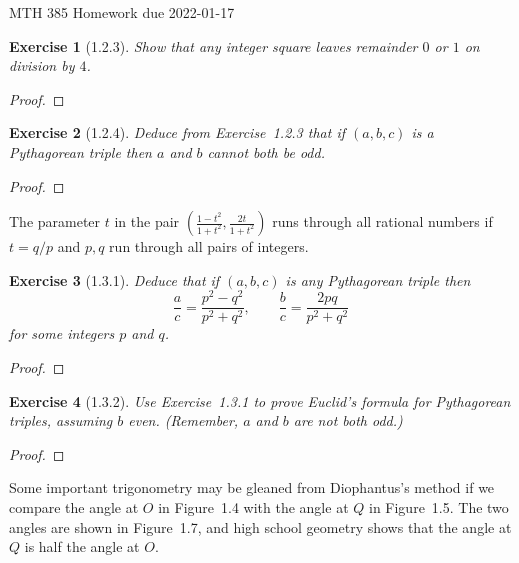\documentclass[12pt]{article}
\theoremstyle{plain}
\newtheorem{ex}{Exercise}
\begin{document}
MTH 385 \qquad Homework due 2022-01-17

\begin{ex} [1.2.3]
  Show that any integer square leaves remainder $0$ or $1$ on division by $4$.
\end{ex}

\begin{proof}
 
\end{proof}

\begin{ex} [1.2.4]
  Deduce from Exercise~1.2.3 that if $(a,b,c)$ is a Pythagorean triple then $a$ and $b$ cannot both be odd.
\end{ex}

\begin{proof}
 
\end{proof}

The parameter $t$ in the pair $\left(\frac{1-t^2}{1+t^2},\frac{2t}{1+t^2}\right)$ runs through all rational numbers if $t=q/p$ and $p,q$ run through all pairs of integers.

\begin{ex} [1.3.1]
  Deduce that if $(a,b,c)$ is any Pythagorean triple then
  \[
    \frac{a}{c}=\frac{p^2-q^2}{p^2+q^2},\qquad\frac{b}{c}=\frac{2pq}{p^2+q^2}
  \]
  for some integers $p$ and $q$.
\end{ex}

\begin{proof}
 
\end{proof}

\begin{ex} [1.3.2]
  Use Exercise~1.3.1 to prove Euclid's formula for Pythagorean triples, assuming $b$ even. (Remember, $a$ and $b$ are not both odd.)
\end{ex}

\begin{proof}
 
\end{proof}

Some important trigonometry may be gleaned from Diophantus's method if we compare the angle at $O$ in Figure~1.4 with the angle at $Q$ in Figure~1.5. The two angles are shown in Figure~1.7, and high school geometry shows that the angle at $Q$ is half the angle at $O$.

\begin{center}
\end{center}
\end{document}
